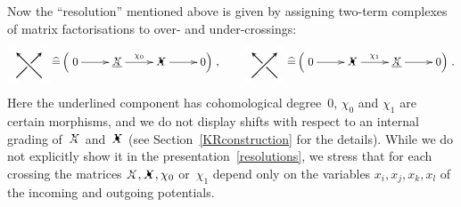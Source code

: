 \documentclass{compositio}
\theoremstyle{definition}
\numberwithin{equation}{section}
\begin{document}
Now the ``resolution''  mentioned above is given by assigning two-term complexes of matrix factorisations to over- and under-crossings: 
\begin{equation}
\label{resolutions}
\begin{tikzpicture}[scale=0.5,baseline, inner sep=1mm, >=stealth]
\node (0) at (0,0) [circle,inner sep=1.5pt, draw=white,fill= white] {};
\node (bl) at (-1,-1) [circle,draw=white,fill= white] {};
\node (br) at (1,-1) [circle,draw=white,fill= white] {};
\node (tl) at (-1,1) [circle,draw=white,fill= white] {};
\node (tr) at (1,1) [circle,draw=white,fill= white] {};
\draw[-, thick] (bl) -- (0); 
\draw[->, thick] (br) -- (tl); 
\draw[->, thick] (0) -- (tr); 
\end{tikzpicture}
\,\widehat =\,
\Big(
\xymatrix{%
0 \vphantom{\underline{X}} \ar[r] & \underline{\Xcirc} \ar[r]^{\chi_{0}} & \Xbul \vphantom{\underline{X}} \ar[r] & 0 \vphantom{\underline{X}} \Big) 
}
,  \qquad
\begin{tikzpicture}[scale=0.5,baseline, inner sep=1mm, >=stealth]
\node (0) at (0,0) [circle,inner sep=1.5pt, draw=white,fill= white] {};
\node (bl) at (-1,-1) [circle,draw=white,fill= white] {};
\node (br) at (1,-1) [circle,draw=white,fill= white] {};
\node (tl) at (-1,1) [circle,draw=white,fill= white] {};
\node (tr) at (1,1) [circle,draw=white,fill= white] {};
\draw[->, thick] (bl) -- (tr); 
\draw[-, thick] (br) -- (0); 
\draw[->, thick] (0) -- (tl); 
\end{tikzpicture}
\,\widehat =\,
\Big(
\xymatrix{%
0 \vphantom{\underline{X}} \ar[r] & \Xbul \vphantom{\underline{X}} \ar[r]^{\chi_{1}} & \underline{\Xcirc} \ar[r] & 0 \vphantom{\underline{X}} \Big) 
}
.
\end{equation}
Here the underlined component has cohomological degree~$0$, $\chi_{0}$ and $\chi_{1}$ are certain morphisms, and we do not display shifts with respect to an internal grading of~$\Xcirc$ and~$\Xbul$ (see Section~\ref{KRconstruction} for the details). While we do not explicitly show it in the presentation~\eqref{resolutions}, we stress that for each crossing the matrices $\Xcirc,\Xbul,\chi_{0}$ or~$\chi_{1}$ depend only on the variables $x_{i},x_{j},x_{k},x_{l}$ of the incoming and outgoing potentials. 
\end{document}
